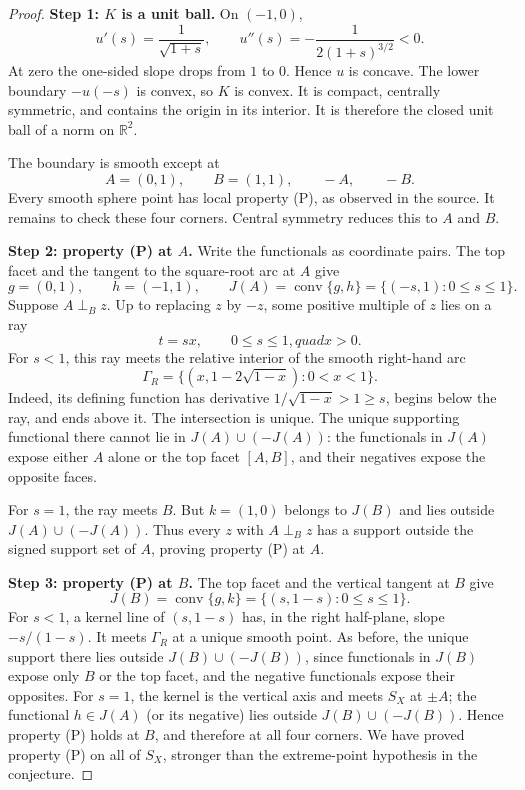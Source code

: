 \documentclass[11pt]{article}
\newcommand{\R}{\mathbb R}
\newcommand{\conv}{\operatorname{conv}}
\newcommand{\JB}{\perp_{B}}
\begin{document}
\begin{proof}
\textbf{Step 1: $K$ is a unit ball.}
On $(-1,0)$,
\[
 u'(s)=\frac{1}{\sqrt{1+s}},\qquad
 u''(s)=-\frac{1}{2(1+s)^{3/2}}<0.
\]
At zero the one-sided slope drops from $1$ to $0$.  Hence $u$ is concave.
The lower boundary $-u(-s)$ is convex, so $K$ is convex.  It is compact,
centrally symmetric, and contains the origin in its interior.  It is
therefore the closed unit ball of a norm on $\R^2$.

The boundary is smooth except at
\[
 A=(0,1),\qquad B=(1,1),\qquad -A,\qquad -B.
\]
Every smooth sphere point has local property (P), as observed in the source.
It remains to check these four corners.  Central symmetry reduces this to
$A$ and $B$.

\textbf{Step 2: property (P) at $A$.}
Write the functionals as coordinate pairs.  The top facet and the tangent to
the square-root arc at $A$ give
\[
 g=(0,1),\qquad h=(-1,1),\qquad
 J(A)=\conv\{g,h\}=\{(-s,1):0\leq s\leq1\}.
\]
Suppose $A\JB z$.  Up to replacing $z$ by $-z$, some positive multiple of
$z$ lies on a ray
\[
 t=sx,\qquad 0\leq s\leq1,quad x>0.
\]
For $s<1$, this ray meets the relative interior of the smooth right-hand arc
\[
 \Gamma_R=\{(x,1-2\sqrt{1-x}):0<x<1\}.
\]
Indeed, its defining function has derivative
$1/\sqrt{1-x}>1\geq s$, begins below the ray, and ends above it.  The
intersection is unique.  The unique supporting functional there cannot lie
in $J(A)\cup(-J(A))$: the functionals in $J(A)$ expose either $A$ alone or
the top facet $[A,B]$, and their negatives expose the opposite faces.

For $s=1$, the ray meets $B$.  But $k=(1,0)$ belongs to $J(B)$ and lies
outside $J(A)\cup(-J(A))$.  Thus every $z$ with $A\JB z$ has a support
outside the signed support set of $A$, proving property (P) at $A$.

\textbf{Step 3: property (P) at $B$.}
The top facet and the vertical tangent at $B$ give
\[
 J(B)=\conv\{g,k\}=\{(s,1-s):0\leq s\leq1\}.
\]
For $s<1$, a kernel line of $(s,1-s)$ has, in the right half-plane,
slope $-s/(1-s)$.  It meets $\Gamma_R$ at a unique smooth point.  As before,
the unique support there lies outside $J(B)\cup(-J(B))$, since functionals
in $J(B)$ expose only $B$ or the top facet, and the negative functionals
expose their opposites.  For $s=1$, the kernel is the vertical axis and meets
$S_X$ at $\pm A$; the functional $h\in J(A)$ (or its negative) lies outside
$J(B)\cup(-J(B))$.  Hence property (P) holds at $B$, and therefore at all
four corners.  We have proved property (P) on all of $S_X$, stronger than
the extreme-point hypothesis in the conjecture.


\end{proof}
\end{document}
